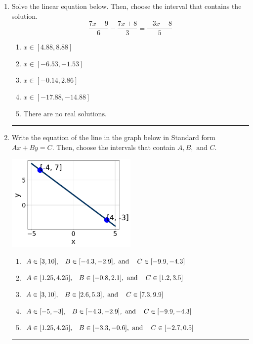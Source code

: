 \documentclass[14pt]{extbook}
\newcommand{\litem}[1]{\item#1\hspace*{-1cm}\rule{\textwidth}{0.4pt}}
\begin{document}
\begin{enumerate}
{\begin{enumerate}[label=\Alph*.]
\end{enumerate} }
\litem{
Solve the linear equation below. Then, choose the interval that contains the solution.\[ \frac{7x -9}{6} - \frac{7x + 8}{3} = \frac{-3x -8}{5} \]\begin{enumerate}[label=\Alph*.]
\item \( x \in [4.88, 8.88] \)
\item \( x \in [-6.53, -1.53] \)
\item \( x \in [-0.14, 2.86] \)
\item \( x \in [-17.88, -14.88] \)
\item \( \text{There are no real solutions.} \)

\end{enumerate} }
\litem{
Write the equation of the line in the graph below in Standard form $Ax+By=C$. Then, choose the intervals that contain $A, B, \text{ and } C$.
\begin{center}
    \includegraphics[width=0.5\textwidth]{../Figures/linearGraphToStandardCopyB.png}
\end{center}
\begin{enumerate}[label=\Alph*.]
\item \( A \in [3, 10], \hspace{3mm} B \in [-4.3, -2.9], \text{ and } \hspace{3mm} C \in [-9.9, -4.3] \)
\item \( A \in [1.25, 4.25], \hspace{3mm} B \in [-0.8, 2.1], \text{ and } \hspace{3mm} C \in [1.2, 3.5] \)
\item \( A \in [3, 10], \hspace{3mm} B \in [2.6, 5.3], \text{ and } \hspace{3mm} C \in [7.3, 9.9] \)
\item \( A \in [-5, -3], \hspace{3mm} B \in [-4.3, -2.9], \text{ and } \hspace{3mm} C \in [-9.9, -4.3] \)
\item \( A \in [1.25, 4.25], \hspace{3mm} B \in [-3.3, -0.6], \text{ and } \hspace{3mm} C \in [-2.7, 0.5] \)


\end{enumerate}}
\end{enumerate}
\end{document}

